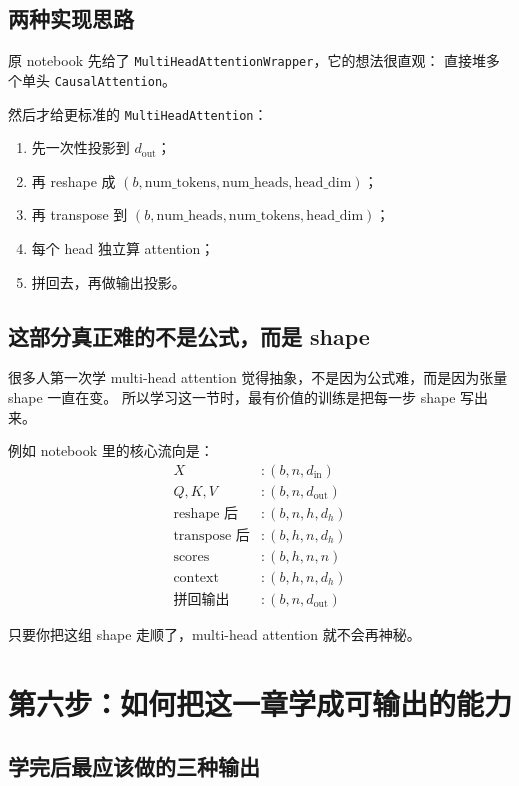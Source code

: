 \documentclass[12pt,a4paper]{ctexart}
\newcommand{\code}[1]{\texttt{#1}}
\begin{document}
\subsection{两种实现思路}

原 notebook 先给了 \code{MultiHeadAttentionWrapper}，它的想法很直观：
直接堆多个单头 \code{CausalAttention}。

然后才给更标准的 \code{MultiHeadAttention}：

\begin{enumerate}
  \item 先一次性投影到 \(d_{\text{out}}\)；
  \item 再 reshape 成 \((b, \text{num\_tokens}, \text{num\_heads}, \text{head\_dim})\)；
  \item 再 transpose 到 \((b, \text{num\_heads}, \text{num\_tokens}, \text{head\_dim})\)；
  \item 每个 head 独立算 attention；
  \item 拼回去，再做输出投影。
\end{enumerate}

\subsection{这部分真正难的不是公式，而是 shape}

很多人第一次学 multi-head attention 觉得抽象，不是因为公式难，而是因为张量 shape 一直在变。
所以学习这一节时，最有价值的训练是把每一步 shape 写出来。

例如 notebook 里的核心流向是：
\[
\begin{aligned}
X &: (b, n, d_{\text{in}}) \\
Q, K, V &: (b, n, d_{\text{out}}) \\
\text{reshape 后} &: (b, n, h, d_h) \\
\text{transpose 后} &: (b, h, n, d_h) \\
\text{scores} &: (b, h, n, n) \\
\text{context} &: (b, h, n, d_h) \\
\text{拼回输出} &: (b, n, d_{\text{out}})
\end{aligned}
\]

只要你把这组 shape 走顺了，multi-head attention 就不会再神秘。

\section{第六步：如何把这一章学成可输出的能力}

\subsection{学完后最应该做的三种输出}
\end{document}
